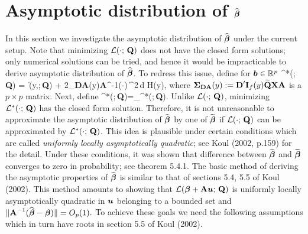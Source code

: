 \section{Asymptotic distribution of $\widehat{\mbox{\boldmath $\beta$}}$}
In this section we investigate the asymptotic distribution of $\widehat{\mbox{\boldmath $\beta$}}$ under the current setup. Note that minimizing ${\cal L}(\cdot;\,\textbf{Q})$ does not have the closed form solutions; only numerical solutions can be tried, and hence it would be impracticable to derive asymptotic distribution of $\widehat{\mbox{\boldmath $\beta$}}$. To redress this issue, define for $\mbox{\boldmath $b$}\in {\mathbb R}^{p}$
\benn
{\cL}^{*}(;\,\textbf{Q}) = \int\,\big\|(y,\mbf{\b};\,\textbf{Q}) + 2\mbf{\Sigma}_{\textbf{DA}}(y)\textbf{A}^{-1}(-\mbf{\b}) \big\|^{2}\,d H(y),
\eenn
where $\mbox{\boldmath $\Sigma$}_{\textbf{DA}}(y):=\textbf{D}'\textbf{I}_{f}(y)\widetilde{\textbf{Q}}\textbf{X}\textbf{A}$ is a $p\times p$ matrix. Next, define
\benn
{\cL}^{*}(\widetilde{\mbf{\b}};\,\textbf{Q})=\inf_{}{\cL}^{*}(;\,\textbf{Q}).
\eenn
Unlike ${\cal L}(\cdot;\,\textbf{Q})$, minimizing ${\cal L}^{*}(\cdot;\,\textbf{Q})$ has the closed form solution. Therefore, it is not unreasonable to approximate the asymptotic distribution of $\widehat{\mbox{\boldmath $\beta$}}$ by one of $\widetilde{\mbox{\boldmath $\beta$}}$ if ${\cal L}(\cdot;\,\textbf{Q})$ can be approximated by ${\cal L}^{*}(\cdot;\,\textbf{Q})$. This idea is plausible under certain conditions which are called \textit{uniformly locally asymptotically quadratic}; see Koul (2002, p.159) for the detail. Under these conditions, it was shown that difference between $\widehat{\mbox{\boldmath $\beta$}}$ and $\widetilde{\mbox{\boldmath $\beta$}}$ converges to zero in probability; see theorem 5.4.1. The basic method of deriving the asymptotic properties of $\widehat{\mbox{\boldmath $\beta$}}$ is similar to that of sections 5.4, 5.5 of Koul (2002). This method amounts to showing that ${\cal L}(\mbox{\boldmath $\beta$} + \textbf{A}\mbox{\boldmath $u$};\,\textbf{Q})$ is uniformly locally asymptotically quadratic in $\mbox{\boldmath $u$}$ belonging to a bounded set and  $\|\textbf{A}^{-1}(\widehat{\mbox{\boldmath $\beta$}}-\mbox{\boldmath $\beta$})\|=O_p(1).$ To achieve these goals we need the following assumptions which in turn have roots in section 5.5 of Koul (2002).

